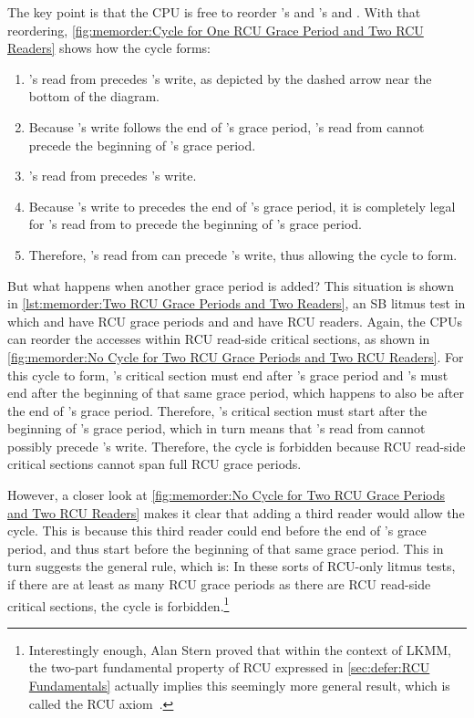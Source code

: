 The key point is that the CPU is free to reorder 's and 's
 and .
With that reordering,
\cref{fig:memorder:Cycle for One RCU Grace Period and Two RCU Readers}
shows how the cycle forms:

\begin{enumerate}
\item	{}'s read from  precedes 's write, as
	depicted by the dashed arrow near the bottom of the diagram.
\item	Because 's write follows the end of 's grace period,
	's read from  cannot precede the beginning of
	's grace period.
\item	{}'s read from  precedes 's write.
\item	Because 's write to  precedes the end of
	's grace period, it is completely legal for 's
	read from  to precede the beginning of 's grace period.
\item	Therefore, 's read from  can precede 's
	write, thus allowing the cycle to form.
\end{enumerate}

But what happens when another grace period is added?
This situation is shown in
\cref{lst:memorder:Two RCU Grace Periods and Two Readers},
an SB litmus test in which  and  have RCU grace periods
and  and  have RCU readers.
Again, the CPUs can reorder the accesses within RCU read-side critical
sections, as shown in
\cref{fig:memorder:No Cycle for Two RCU Grace Periods and Two RCU Readers}.
For this cycle to form, 's critical section must
end after 's grace period and 's must end after the
beginning of that same grace period, which happens to also be after the
end of 's grace period.
Therefore, 's critical section must start after the beginning
of 's grace period, which in turn means that 's
read from  cannot possibly precede 's write.
Therefore, the cycle is forbidden because RCU read-side critical sections
cannot span full RCU grace periods.

However, a closer look at
\cref{fig:memorder:No Cycle for Two RCU Grace Periods and Two RCU Readers}
makes it clear that adding a third reader would allow the cycle.
This is because this third reader could end before the end of 's
grace period, and thus start before the beginning of that same grace
period.
This in turn suggests the general rule, which is:  In these sorts of RCU-only
litmus tests, if there are at least as many RCU grace periods as there
are RCU read-side critical sections, the cycle is forbidden.\footnote{
	Interestingly enough, Alan Stern proved that within the context
	of LKMM, the two-part fundamental property of RCU expressed
	in \cref{sec:defer:RCU Fundamentals} actually implies
	this seemingly more general result, which is called the RCU
	axiom~\cite{Alglave:2018:FSC:3173162.3177156}.}

